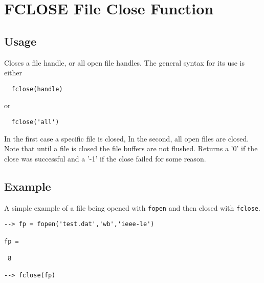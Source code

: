 \section{FCLOSE File Close Function}

\subsection{Usage}

Closes a file handle, or all open file handles.  The general syntax
for its use is either
\begin{verbatim}
  fclose(handle)
\end{verbatim}
or
\begin{verbatim}
  fclose('all')
\end{verbatim}
In the first case a specific file is closed,  In the second, all open
files are closed.  Note that until a file is closed the file buffers
are not flushed.  Returns a '0' if the close was successful and a '-1' if
the close failed for some reason.
\subsection{Example}

A simple example of a file being opened with \verb|fopen| and then closed with \verb|fclose|.
\begin{verbatim}
--> fp = fopen('test.dat','wb','ieee-le')

fp = 

 8 

--> fclose(fp)
\end{verbatim}
